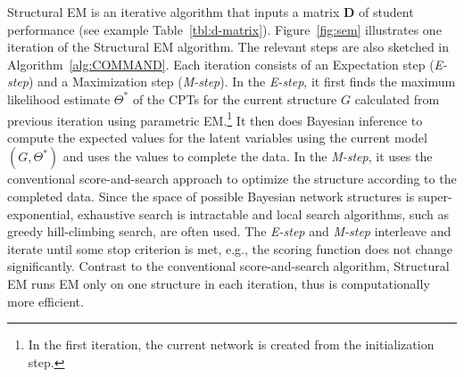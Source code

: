 \documentclass{edm_template}
\begin{document}
Structural EM is an iterative algorithm that  inputs a matrix $\mathbf{D}$ of student performance (see example Table~\ref{tbl:d-matrix}). %
Figure~\ref{fig:sem} illustrates one iteration of the Structural EM algorithm. The relevant steps are also sketched in Algorithm~\ref{alg:COMMAND}. 
Each iteration consists of an Expectation step (\emph{E-step}) and a Maximization step (\emph{M-step}). 
In the \emph{E-step}, it first finds the maximum likelihood estimate $\Theta^*$ of the CPTs 
for the current structure $G$ calculated from previous iteration using parametric EM.\footnote{In the first iteration, the current network is created from the initialization step.}
It then does Bayesian inference to compute the expected values for the latent variables using the current model $(G,\Theta^*)$
and uses the values to complete the data.
In the \emph{M-step}, it uses the conventional score-and-search approach to optimize the structure according to the completed data.
Since the space of possible Bayesian network structures is super-exponential, 
exhaustive search is intractable and local search algorithms, such as greedy hill-climbing search, are often used.
The \emph{E-step} and \emph{M-step} interleave and iterate until some stop criterion is met, e.g., the scoring function does not change significantly.
Contrast to the conventional score-and-search algorithm, Structural EM runs EM only on one structure in each iteration, thus is computationally more efficient.
\end{document}
